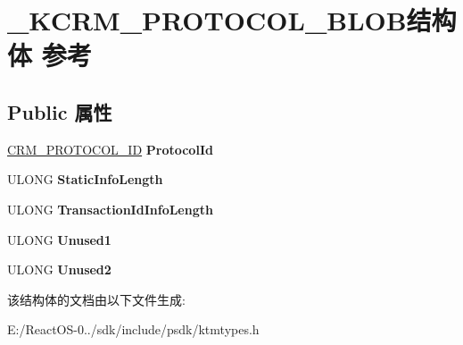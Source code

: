 \hypertarget{struct___k_c_r_m___p_r_o_t_o_c_o_l___b_l_o_b}{}\section{\+\_\+\+K\+C\+R\+M\+\_\+\+P\+R\+O\+T\+O\+C\+O\+L\+\_\+\+B\+L\+O\+B结构体 参考}
\label{struct___k_c_r_m___p_r_o_t_o_c_o_l___b_l_o_b}
\subsection*{Public 属性}
\begin{DoxyCompactItemize}
\item 
\mbox{\label{struct___k_c_r_m___p_r_o_t_o_c_o_l___b_l_o_b_a5a6b03addc4a75304e639957bb7db271}} 
\hyperlink{interface_g_u_i_d}{C\+R\+M\+\_\+\+P\+R\+O\+T\+O\+C\+O\+L\+\_\+\+ID} {\bfseries Protocol\+Id}
\item 
\mbox{\label{struct___k_c_r_m___p_r_o_t_o_c_o_l___b_l_o_b_acb19d73e8835bc68fc95036cbc27a2d2}} 
U\+L\+O\+NG {\bfseries Static\+Info\+Length}
\item 
\mbox{\label{struct___k_c_r_m___p_r_o_t_o_c_o_l___b_l_o_b_a0a6e0790cdeab496e4c08b01f2197458}} 
U\+L\+O\+NG {\bfseries Transaction\+Id\+Info\+Length}
\item 
\mbox{\label{struct___k_c_r_m___p_r_o_t_o_c_o_l___b_l_o_b_a2bcb86b6eaf260c8dfe6ef056234d279}} 
U\+L\+O\+NG {\bfseries Unused1}
\item 
\mbox{\label{struct___k_c_r_m___p_r_o_t_o_c_o_l___b_l_o_b_a4b2da42b384cfc2216c0d1e7f20bba91}} 
U\+L\+O\+NG {\bfseries Unused2}
\end{DoxyCompactItemize}


该结构体的文档由以下文件生成\+:\begin{DoxyCompactItemize}
\item 
E\+:/\+React\+O\+S-\/0../sdk/include/psdk/ktmtypes.\+h\end{DoxyCompactItemize}
